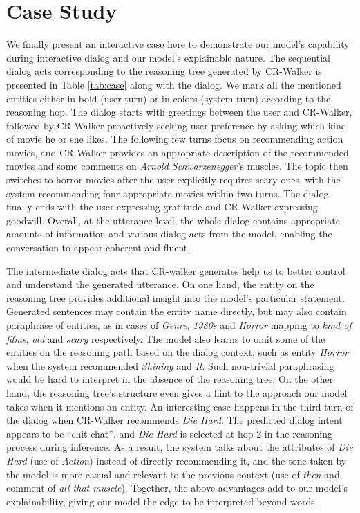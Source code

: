 \documentclass[11pt]{article}
\begin{document}
\section{Case Study}
We finally present an interactive case here to demonstrate our model's capability during interactive dialog and our model's explainable nature. The sequential dialog acts corresponding to the reasoning tree generated by CR-Walker is presented in Table \ref{tab:case} along with the dialog. We mark all the mentioned entities either in bold (user turn) or in colors (system turn) according to the reasoning hop. The dialog starts with greetings between the user and CR-Walker, followed by CR-Walker proactively seeking user preference by asking which kind of movie he or she likes. The following few turns focus on recommending action movies, and CR-Walker provides an appropriate description of the recommended movies and some comments on \textit{Arnold Schwarzenegger}'s muscles. The topic then switches to horror movies after the user explicitly requires scary ones, with the system recommending four appropriate movies within two turns. The dialog finally ends with the user expressing gratitude and CR-Walker expressing goodwill. Overall, at the utterance level, the whole dialog contains appropriate amounts of information and various dialog acts from the model, enabling the conversation to appear coherent and fluent.

The intermediate dialog acts that CR-walker generates help us to better control and understand the generated utterance. On one hand, the entity on the reasoning tree provides additional insight into the model's particular statement. Generated sentences may contain the entity name directly, but may also contain paraphrase of entities, as in cases of \textit{Genre}, \textit{1980s} and \textit{Horror} mapping to \textit{kind of films}, \textit{old} and \textit{scary} respectively. The model also learns to omit some of the entities on the reasoning path based on the dialog context, such as entity \textit{Horror} when the system recommended \textit{Shining} and \textit{It}. Such non-trivial paraphrasing would be hard to interpret in the absence of the reasoning tree. On the other hand, the reasoning tree's structure even gives a hint to the approach our model takes when it mentions an entity. An interesting case happens in the third turn of the dialog when CR-Walker recommends \textit{Die Hard}. The predicted dialog intent appears to be ``chit-chat'', and \textit{Die Hard} is selected at hop 2 in the reasoning process during inference. As a result, the system talks about the attributes of \textit{Die Hard} (use of \textit{Action}) instead of directly recommending it, and the tone taken by the model is more casual and relevant to the previous context (use of \textit{then} and comment of \textit{all that muscle}). Together, the above advantages add to our model's explainability, giving our model the edge to be interpreted beyond words. 
\end{document}
